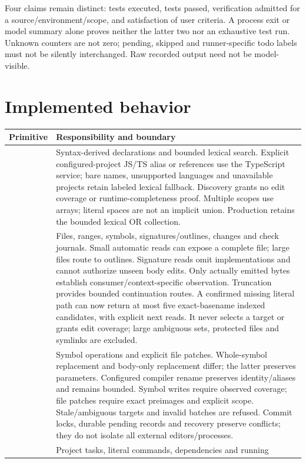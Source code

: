 \documentclass[11pt,a4paper]{article}
\newcommand{\code}[1]{\texttt{\detokenize{#1}}}
\begin{document}
Four claims remain distinct: tests executed, tests passed, verification admitted
for a source/environment/scope, and satisfaction of user criteria. A process exit
or model summary alone proves neither the latter two nor an exhaustive test run.
Unknown counters are not zero; pending, skipped and runner-specific todo labels
must not be silently interchanged. Raw recorded output need not be model-visible.

\section{Implemented behavior}
\begin{longtable}{@{}p{.18\linewidth}p{.75\linewidth}@{}}
\toprule Primitive & Responsibility and boundary \\\midrule\endhead
\code{search_code} & Syntax-derived declarations and bounded lexical search.
Explicit configured-project JS/TS alias or \code{path#qualifiedName} references
use the TypeScript service; bare names, unsupported languages and unavailable
projects retain labeled lexical fallback. Discovery grants no edit coverage or
runtime-completeness proof. Multiple scopes use arrays; literal spaces are not
an implicit union. Production retains the bounded lexical OR collection. \\
\code{read_code} & Files, ranges, symbols, signatures/outlines, changes and check
journals. Small automatic reads can expose a complete file; large files route
to outlines. Signature reads omit implementations and cannot authorize unseen
body edits. Only actually emitted bytes establish consumer/context-specific
observation. Truncation provides bounded continuation routes. A confirmed missing
literal path can now return at most five exact-basename indexed candidates,
with explicit next reads. It never selects a target or grants edit coverage;
large ambiguous sets, protected files and symlinks are excluded. \\
\code{edit_code} & Symbol operations and explicit file patches. Whole-symbol
replacement and body-only replacement differ; the latter preserves parameters.
Configured compiler rename preserves identity/aliases and remains bounded.
Symbol writes require observed coverage; file patches require exact preimages
and explicit scope. Stale/ambiguous targets and invalid batches are refused.
Commit locks, durable pending records and recovery preserve conflicts; they do
not isolate all external editors/processes. \\
\code{run_task} & Project tasks, literal commands, dependencies and running

\end{longtable}
\end{document}
